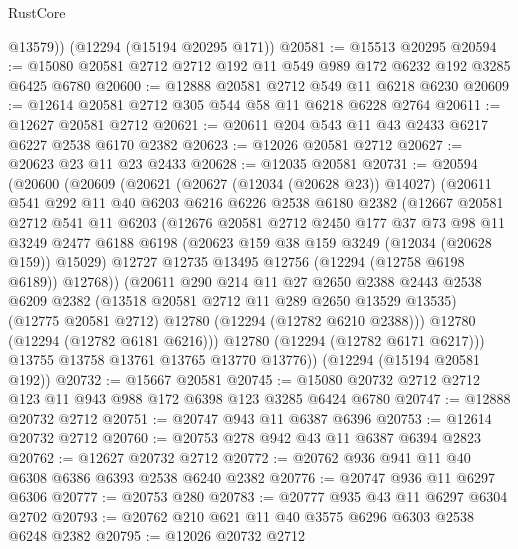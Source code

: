\begin{lexlean}{RustCore}
\begin{coremodule}
        @13579))
    (@12294 (@15194 @20295 @171))
@20581 := @15513 @20295
@20594 := @15080 @20581 @2712 @2712 @192 @11 @549 @989 @172 @6232 @192 @3285 @6425 @6780
@20600 := @12888 @20581 @2712 @549 @11 @6218 @6230
@20609 := @12614 @20581 @2712 @305 @544 @58 @11 @6218 @6228 @2764
@20611 := @12627 @20581 @2712
@20621 := @20611 @204 @543 @11 @43 @2433 @6217 @6227 @2538 @6170 @2382
@20623 := @12026 @20581 @2712
@20627 := @20623 @23 @11 @23 @2433
@20628 := @12035 @20581
@20731 := @20594
    (@20600
      (@20609
        (@20621
          (@20627 (@12034 (@20628 @23)) @14027)
          (@20611
            @541
            @292
            @11
            @40
            @6203
            @6216
            @6226
            @2538
            @6180
            @2382
            (@12667
              @20581
              @2712
              @541
              @11
              @6203
              (@12676
                @20581
                @2712
                @2450
                @177
                @37
                @73
                @98
                @11
                @3249
                @2477
                @6188
                @6198
                (@20623 @159 @38 @159 @3249 (@12034 (@20628 @159)) @15029)
                @12727
                @12735
                @13495
                @12756
                (@12294 (@12758 @6198 @6189))
                @12768))
            (@20611
              @290
              @214
              @11
              @27
              @2650
              @2388
              @2443
              @2538
              @6209
              @2382
              (@13518 @20581 @2712 @11 @289 @2650 @13529 @13535)
              (@12775 @20581 @2712)
              @12780
              (@12294 (@12782 @6210 @2388)))
            @12780
            (@12294 (@12782 @6181 @6216)))
          @12780
          (@12294 (@12782 @6171 @6217)))
        @13755
        @13758
        @13761
        @13765
        @13770
        @13776))
    (@12294 (@15194 @20581 @192))
@20732 := @15667 @20581
@20745 := @15080 @20732 @2712 @2712 @123 @11 @943 @988 @172 @6398 @123 @3285 @6424 @6780
@20747 := @12888 @20732 @2712
@20751 := @20747 @943 @11 @6387 @6396
@20753 := @12614 @20732 @2712
@20760 := @20753 @278 @942 @43 @11 @6387 @6394 @2823
@20762 := @12627 @20732 @2712
@20772 := @20762 @936 @941 @11 @40 @6308 @6386 @6393 @2538 @6240 @2382
@20776 := @20747 @936 @11 @6297 @6306
@20777 := @20753 @280
@20783 := @20777 @935 @43 @11 @6297 @6304 @2702
@20793 := @20762 @210 @621 @11 @40 @3575 @6296 @6303 @2538 @6248 @2382
@20795 := @12026 @20732 @2712

\end{coremodule}
\end{lexlean}
